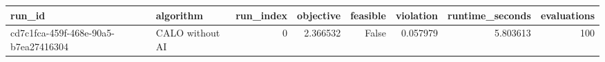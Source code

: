 \begin{tabular}{llrrrrrr}
\toprule
run_id & algorithm & run_index & objective & feasible & violation & runtime_seconds & evaluations \\
\midrule
cd7c1fca-459f-468e-90a5-b7ea27416304 & CALO without AI & 0 & 2.366532 & False & 0.057979 & 5.803613 & 100 \\
\bottomrule
\end{tabular}
